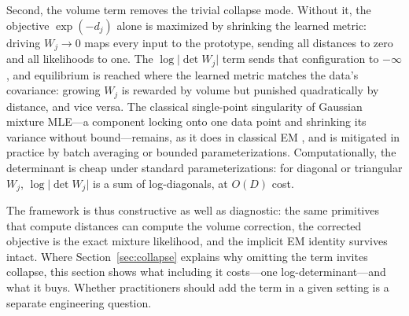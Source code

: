 Second, the volume term removes the trivial collapse mode. Without it, the objective $\exp(-d_j)$ alone is maximized by shrinking the learned metric: driving $W_j \to 0$ maps every input to the prototype, sending all distances to zero and all likelihoods to one. The $\log\lvert\det W_j\rvert$ term sends that configuration to $-\infty$, and equilibrium is reached where the learned metric matches the data's covariance: growing $W_j$ is rewarded by volume but punished quadratically by distance, and vice versa. The classical single-point singularity of Gaussian mixture MLE---a component locking onto one data point and shrinking its variance without bound---remains, as it does in classical EM \citep{bishop2006pattern}, and is mitigated in practice by batch averaging or bounded parameterizations. Computationally, the determinant is cheap under standard parameterizations: for diagonal or triangular $W_j$, $\log\lvert\det W_j\rvert$ is a sum of log-diagonals, at $O(D)$ cost.

The framework is thus constructive as well as diagnostic: the same primitives that compute distances can compute the volume correction, the corrected objective is the exact mixture likelihood, and the implicit EM identity survives intact. Where Section~\ref{sec:collapse} explains why omitting the term invites collapse, this section shows what including it costs---one log-determinant---and what it buys. Whether practitioners should add the term in a given setting is a separate engineering question.
